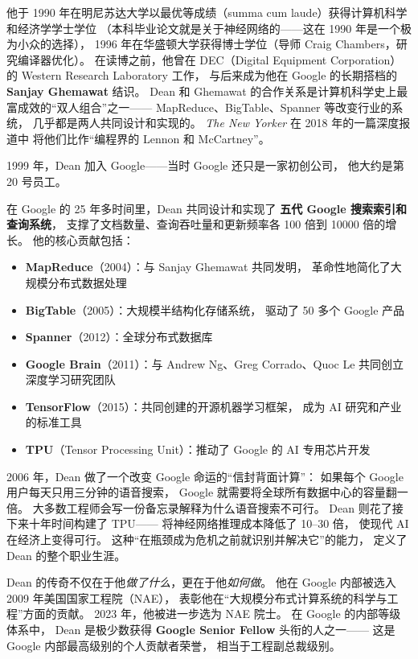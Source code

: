 他于 1990 年在明尼苏达大学以最优等成绩（summa cum laude）获得计算机科学和经济学学士学位
（本科毕业论文就是关于神经网络的——这在 1990 年是一个极为小众的选择），
1996 年在华盛顿大学获得博士学位（导师 Craig Chambers，研究编译器优化）。
在读博之前，他曾在 DEC（Digital Equipment Corporation）的
Western Research Laboratory 工作，
与后来成为他在 Google 的长期搭档的 \textbf{Sanjay Ghemawat} 结识。
Dean 和 Ghemawat 的合作关系是计算机科学史上最富成效的``双人组合''之一——
MapReduce、BigTable、Spanner 等改变行业的系统，
几乎都是两人共同设计和实现的。
\textit{The New Yorker} 在 2018 年的一篇深度报道中
将他们比作``编程界的 Lennon 和 McCartney''。

1999 年，Dean 加入 Google——当时 Google 还只是一家初创公司，
他大约是第 20 号员工。

在 Google 的 25 年多时间里，Dean 共同设计和实现了
\textbf{五代 Google 搜索索引和查询系统}，
支撑了文档数量、查询吞吐量和更新频率各 100 倍到 10000 倍的增长。
他的核心贡献包括：

\begin{itemize}[noitemsep]
  \item \textbf{MapReduce}（2004）：与 Sanjay Ghemawat 共同发明，
        革命性地简化了大规模分布式数据处理
  \item \textbf{BigTable}（2005）：大规模半结构化存储系统，
        驱动了 50 多个 Google 产品
  \item \textbf{Spanner}（2012）：全球分布式数据库
  \item \textbf{Google Brain}（2011）：与 Andrew Ng、Greg Corrado、Quoc Le
        共同创立深度学习研究团队
  \item \textbf{TensorFlow}（2015）：共同创建的开源机器学习框架，
        成为 AI 研究和产业的标准工具
  \item \textbf{TPU}（Tensor Processing Unit）：推动了 Google 的 AI 专用芯片开发
\end{itemize}

\begin{corebox}
2006 年，Dean 做了一个改变 Google 命运的``信封背面计算''：
如果每个 Google 用户每天只用三分钟的语音搜索，
Google 就需要将全球所有数据中心的容量翻一倍。
大多数工程师会写一份备忘录解释为什么语音搜索不可行。
Dean 则花了接下来十年时间构建了 TPU——
将神经网络推理成本降低了 10--30 倍，
使现代 AI 在经济上变得可行。
这种``在瓶颈成为危机之前就识别并解决它''的能力，
定义了 Dean 的整个职业生涯。
\end{corebox}

Dean 的传奇不仅在于他\textit{做了什么}，更在于他\textit{如何做}。
他在 Google 内部被选入 2009 年美国国家工程院（NAE），
表彰他在``大规模分布式计算系统的科学与工程''方面的贡献。
2023 年，他被进一步选为 NAE 院士。
在 Google 的内部等级体系中，
Dean 是极少数获得 \textbf{Google Senior Fellow} 头衔的人之一——
这是 Google 内部最高级别的个人贡献者荣誉，
相当于工程副总裁级别。

